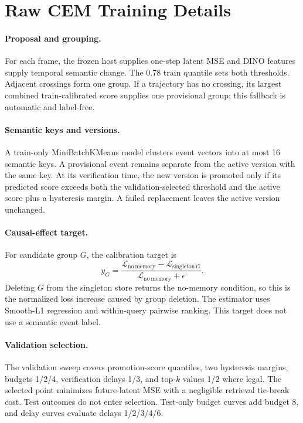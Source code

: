 \section{Raw CEM Training Details}
\label{app:raw-training}

\paragraph{Proposal and grouping.}
For each frame, the frozen host supplies one-step latent MSE and DINO features
supply temporal semantic change. The 0.78 train quantile sets both thresholds.
Adjacent crossings form one group. If a trajectory has no crossing, its
largest combined train-calibrated score supplies one provisional group; this
fallback is automatic and label-free.

\paragraph{Semantic keys and versions.}
A train-only MiniBatchKMeans model clusters event vectors into at most 16
semantic keys. A provisional event remains separate from the active version
with the same key. At its verification time, the new version is promoted only
if its predicted score exceeds both the validation-selected threshold and the
active score plus a hysteresis margin. A failed replacement leaves the active
version unchanged.

\paragraph{Causal-effect target.}
For candidate group $G$, the calibration target is
\[
y_G =
\frac{\mathcal L_{\mathrm{no\ memory}}-
      \mathcal L_{\mathrm{singleton}\ G}}
     {\mathcal L_{\mathrm{no\ memory}}+\epsilon}.
\]
Deleting $G$ from the singleton store returns the no-memory condition, so this
is the normalized loss increase caused by group deletion. The estimator uses
Smooth-L1 regression and within-query pairwise ranking. This target does not
use a semantic event label.

\paragraph{Validation selection.}
The validation sweep covers promotion-score quantiles, two hysteresis margins,
budgets 1/2/4, verification delays 1/3, and top-$k$ values 1/2 where legal.
The selected point minimizes future-latent MSE with a negligible retrieval
tie-break cost. Test outcomes do not enter selection. Test-only budget curves
add budget 8, and delay curves evaluate delays 1/2/3/4/6.

